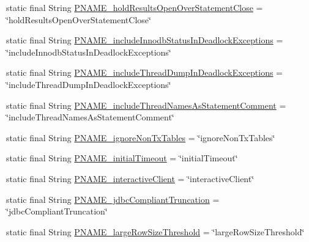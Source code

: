 \begin{DoxyCompactItemize}
\item 
static final String \mbox{\hyperlink{classcom_1_1mysql_1_1cj_1_1conf_1_1_property_definitions_a708866004b5f2b00b1ccb882d1f89d57}{P\+N\+A\+M\+E\+\_\+hold\+Results\+Open\+Over\+Statement\+Close}} = \char`\"{}hold\+Results\+Open\+Over\+Statement\+Close\char`\"{}
\item 
static final String \mbox{\hyperlink{classcom_1_1mysql_1_1cj_1_1conf_1_1_property_definitions_a8e25e18033437b2281ff705223ba6b95}{P\+N\+A\+M\+E\+\_\+include\+Innodb\+Status\+In\+Deadlock\+Exceptions}} = \char`\"{}include\+Innodb\+Status\+In\+Deadlock\+Exceptions\char`\"{}
\item 
static final String \mbox{\hyperlink{classcom_1_1mysql_1_1cj_1_1conf_1_1_property_definitions_aee831ef7e28cc7a42c880b4d548103f4}{P\+N\+A\+M\+E\+\_\+include\+Thread\+Dump\+In\+Deadlock\+Exceptions}} = \char`\"{}include\+Thread\+Dump\+In\+Deadlock\+Exceptions\char`\"{}
\item 
static final String \mbox{\hyperlink{classcom_1_1mysql_1_1cj_1_1conf_1_1_property_definitions_aa7917324423f7f4c6e886c494b71dbdd}{P\+N\+A\+M\+E\+\_\+include\+Thread\+Names\+As\+Statement\+Comment}} = \char`\"{}include\+Thread\+Names\+As\+Statement\+Comment\char`\"{}
\item 
static final String \mbox{\hyperlink{classcom_1_1mysql_1_1cj_1_1conf_1_1_property_definitions_a9d13abad96d517203e39042258a1ad56}{P\+N\+A\+M\+E\+\_\+ignore\+Non\+Tx\+Tables}} = \char`\"{}ignore\+Non\+Tx\+Tables\char`\"{}
\item 
static final String \mbox{\hyperlink{classcom_1_1mysql_1_1cj_1_1conf_1_1_property_definitions_a77d016898d747fee3b6b2bc984eb3c0a}{P\+N\+A\+M\+E\+\_\+initial\+Timeout}} = \char`\"{}initial\+Timeout\char`\"{}
\item 
static final String \mbox{\hyperlink{classcom_1_1mysql_1_1cj_1_1conf_1_1_property_definitions_a4edbe9e755486fdca0dd76c75cdb1d49}{P\+N\+A\+M\+E\+\_\+interactive\+Client}} = \char`\"{}interactive\+Client\char`\"{}
\item 
static final String \mbox{\hyperlink{classcom_1_1mysql_1_1cj_1_1conf_1_1_property_definitions_a7aa492f479eb836e3c018288164bab8e}{P\+N\+A\+M\+E\+\_\+jdbc\+Compliant\+Truncation}} = \char`\"{}jdbc\+Compliant\+Truncation\char`\"{}
\item 
static final String \mbox{\hyperlink{classcom_1_1mysql_1_1cj_1_1conf_1_1_property_definitions_a318c760adb6f0a412f84e1099981f52c}{P\+N\+A\+M\+E\+\_\+large\+Row\+Size\+Threshold}} = \char`\"{}large\+Row\+Size\+Threshold\char`\"{}
\item 

\end{DoxyCompactItemize}
